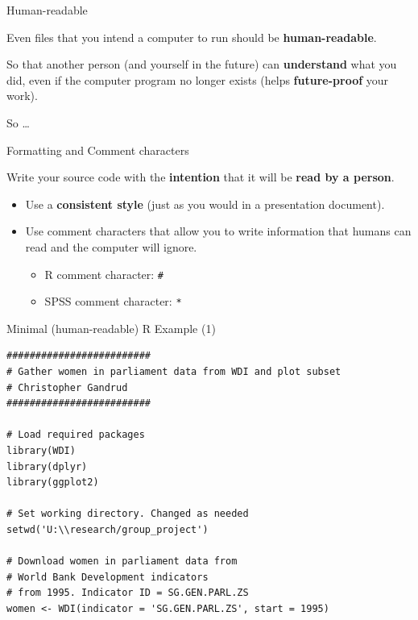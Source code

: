 \documentclass[10pt]{beamer}
\begin{document}
\begin{frame}{Human-readable}

    Even files that you intend a computer to run should be \textbf{human-readable}.

    \vspace{1.5cm}

    So that another person (and yourself in the future) can \textbf{understand} what you did, even if the computer program no longer exists (helps \textbf{future-proof} your work).

    \vspace{0.5cm}

    So \ldots

\end{frame}

\begin{frame}{Formatting and Comment characters}

    Write your source code with the \textbf{intention} that it will be \textbf{read by a person}.

    \begin{itemize}
        \item Use a \textbf{consistent style} (just as you would in a presentation document).

        \item Use \alert{comment characters} that allow you to write information that humans can read and the computer will ignore.

            \begin{itemize}
                \item R comment character: \texttt{\#}
                \item SPSS comment character: \texttt{*}
            \end{itemize}
    \end{itemize}


\end{frame}

\begin{frame}[fragile]{Minimal (human-readable) R Example (1)}

\begin{lstlisting}
#########################
# Gather women in parliament data from WDI and plot subset
# Christopher Gandrud
#########################

# Load required packages
library(WDI)
library(dplyr)
library(ggplot2)

# Set working directory. Changed as needed
setwd('U:\\research/group_project')

# Download women in parliament data from
# World Bank Development indicators
# from 1995. Indicator ID = SG.GEN.PARL.ZS
women <- WDI(indicator = 'SG.GEN.PARL.ZS', start = 1995)
\end{lstlisting}

\end{frame}
\end{document}

